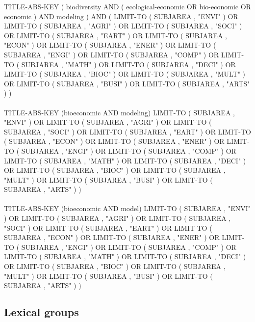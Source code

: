 TITLE-ABS-KEY ( biodiversity  AND  ( ecological-economic  OR  bio-economic  OR  economic )  AND  modeling )  AND  ( LIMIT-TO ( SUBJAREA ,  "ENVI" )  OR  LIMIT-TO ( SUBJAREA ,  "AGRI" )  OR  LIMIT-TO ( SUBJAREA ,  "SOCI" )  OR  LIMIT-TO ( SUBJAREA ,  "EART" )  OR  LIMIT-TO ( SUBJAREA ,  "ECON" )  OR  LIMIT-TO ( SUBJAREA ,  "ENER" )  OR  LIMIT-TO ( SUBJAREA ,  "ENGI" )  OR  LIMIT-TO ( SUBJAREA ,  "COMP" )  OR  LIMIT-TO ( SUBJAREA ,  "MATH" )  OR  LIMIT-TO ( SUBJAREA ,  "DECI" )  OR  LIMIT-TO ( SUBJAREA ,  "BIOC" )  OR  LIMIT-TO ( SUBJAREA ,  "MULT" )  OR  LIMIT-TO ( SUBJAREA ,  "BUSI" )  OR  LIMIT-TO ( SUBJAREA ,  "ARTS" ) ) 
\\\\
TITLE-ABS-KEY (bioeconomic AND modeling) LIMIT-TO ( SUBJAREA ,  "ENVI" )  OR  LIMIT-TO ( SUBJAREA ,  "AGRI" )  OR  LIMIT-TO ( SUBJAREA ,  "SOCI" )  OR  LIMIT-TO ( SUBJAREA ,  "EART" )  OR  LIMIT-TO ( SUBJAREA ,  "ECON" )  OR  LIMIT-TO ( SUBJAREA ,  "ENER" )  OR  LIMIT-TO ( SUBJAREA ,  "ENGI" )  OR  LIMIT-TO ( SUBJAREA ,  "COMP" )  OR  LIMIT-TO ( SUBJAREA ,  "MATH" )  OR  LIMIT-TO ( SUBJAREA ,  "DECI" )  OR  LIMIT-TO ( SUBJAREA ,  "BIOC" )  OR  LIMIT-TO ( SUBJAREA ,  "MULT" )  OR  LIMIT-TO ( SUBJAREA ,  "BUSI" )  OR  LIMIT-TO ( SUBJAREA ,  "ARTS" ) ) 
\\\\
TITLE-ABS-KEY (bioeconomic AND model) LIMIT-TO ( SUBJAREA ,  "ENVI" )  OR  LIMIT-TO ( SUBJAREA ,  "AGRI" )  OR  LIMIT-TO ( SUBJAREA ,  "SOCI" )  OR  LIMIT-TO ( SUBJAREA ,  "EART" )  OR  LIMIT-TO ( SUBJAREA ,  "ECON" )  OR  LIMIT-TO ( SUBJAREA ,  "ENER" )  OR  LIMIT-TO ( SUBJAREA ,  "ENGI" )  OR  LIMIT-TO ( SUBJAREA ,  "COMP" )  OR  LIMIT-TO ( SUBJAREA ,  "MATH" )  OR  LIMIT-TO ( SUBJAREA ,  "DECI" )  OR  LIMIT-TO ( SUBJAREA ,  "BIOC" )  OR  LIMIT-TO ( SUBJAREA ,  "MULT" )  OR  LIMIT-TO ( SUBJAREA ,  "BUSI" )  OR  LIMIT-TO ( SUBJAREA ,  "ARTS" ) ) 

\subsection{Lexical groups}
\label{appendix:lexical_groups}

